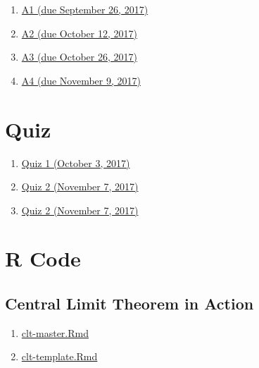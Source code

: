 \documentclass[]{book}
\providecommand{\tightlist}{%
  \setlength{\itemsep}{0pt}\setlength{\parskip}{0pt}}
\providecommand{\tightlist}{%
  \setlength{\itemsep}{0pt}\setlength{\parskip}{0pt}}
\theoremstyle{definition}
\theoremstyle{definition}
\theoremstyle{definition}
\theoremstyle{remark}
\begin{document}
\begin{enumerate}
\def\labelenumi{\arabic{enumi}.}
\tightlist
\item
  \href{https://github.com/sahirbhatnagar/MATH697/blob/master/images/HW-1-F2017.pdf}{A1
  (due September 26, 2017)}
\item
  \href{https://github.com/sahirbhatnagar/MATH697/blob/master/images/HW-2-F2017.pdf}{A2
  (due October 12, 2017)}
\item
  \href{https://github.com/sahirbhatnagar/MATH697/blob/master/images/HW-3-F2017.pdf}{A3
  (due October 26, 2017)}
\item
  \href{https://github.com/sahirbhatnagar/MATH697/blob/master/images/HW-4-F2017.pdf}{A4
  (due November 9, 2017)}
\end{enumerate}

\chapter*{Quiz}\label{quiz}

\begin{enumerate}
\def\labelenumi{\arabic{enumi}.}
\tightlist
\item
  \href{https://github.com/sahirbhatnagar/MATH697/blob/master/images/quiz-1-F2017.pdf}{Quiz
  1 (October 3, 2017)}
\item
  \href{https://github.com/sahirbhatnagar/MATH697/blob/master/images/quiz-2-F2017.pdf}{Quiz
  2 (November 7, 2017)}
\item
  \href{https://github.com/sahirbhatnagar/MATH697/blob/master/images/quiz-3-F2017.pdf}{Quiz
  2 (November 7, 2017)}
\end{enumerate}

\chapter*{R Code}\label{r-code}

\section{Central Limit Theorem in
Action}\label{central-limit-theorem-in-action}

\begin{enumerate}
\def\labelenumi{\arabic{enumi}.}
\tightlist
\item
  \href{https://github.com/sahirbhatnagar/MATH697/blob/master/images/clt-master.Rmd}{clt-master.Rmd}\\
\item
  \href{https://github.com/sahirbhatnagar/MATH697/blob/master/images/clt-template.Rmd}{clt-template.Rmd}
\end{enumerate}
\end{document}
